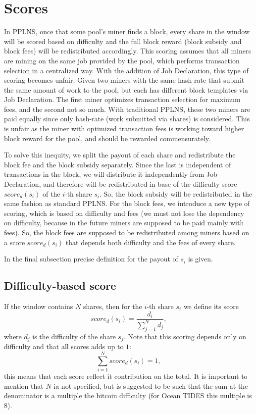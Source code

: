 \documentclass[10pt]{article}
\begin{document}
\section{Scores}
In PPLNS, once that some pool's miner finds a block, every share in the window will be scored based on difficulty and the full block reward (block subsidy and block fees) will be redistributed accordingly. This scoring assumes that all miners are mining on the same job provided by the pool, which performs transaction selection in a centralized way. With the addition of Job Declaration, this type of scoring becomes unfair. Given two miners with the same hash-rate that submit the same amount of work to the pool, but each has different block templates via Job Declaration. The first miner optimizes transaction selection for maximum fees, and the second not so much. With traditional PPLNS, these two miners are paid equally since only hash-rate (work submitted via shares) is considered. This is unfair as the miner with optimized transaction fees is working toward higher block reward for the pool, and should be rewarded commensurately.

To solve this inequity, we split the payout of each share and redistribute the block fee and the block subsidy separately. Since the last is independent of transactions in the block, we will distribute it independently from Job Declaration, and therefore will be redistributed in base of the difficulty score $score_d(s_i)$ of the $i$-th share $s_i$. So, the block subsidy will be redistributed in the same fashion as standard PPLNS. \newline
For the block fees, we introduce a new type of scoring, which is based on difficulty and fees (we must not lose the dependency on difficulty, because in the future miners are supposed to be paid mainly with fees). So, the block fees are supposed to be redistributed among miners based on a score $score_d(s_i)$ that depends both difficulty and the fees of every share.

In the final subsection precise definition for the payout of $s_i$ is given.

\subsection{Difficulty-based score}
If the window contains $N$ shares, then for the $i$-th share $s_i$ we define its score
\[score_d(s_i) = \frac{d_i}{\sum_{j=1}^Nd_j},\]
where $d_j$ is the difficulty of the share $s_j$. 	Note that this scoring depends only on difficulty and that all scores adds up to $1$:
\[\sum_{i=1}^N score_d(s_i) = 1,\] this means that each score reflect it contribution on the total. 
It is important to mention that $N$ ia not specified, but is suggested to be such that the sum at the denominator is a multiple the bitcoin difficulty (for Ocean TIDES \cite{ocean} this multiple is $8$).
\end{document}
